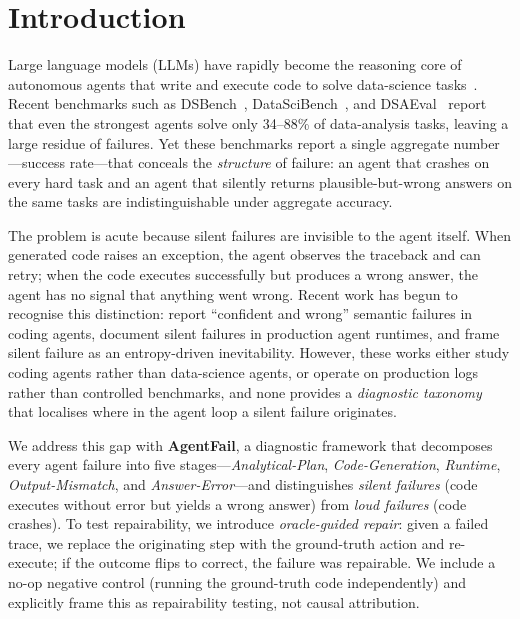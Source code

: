 \section{Introduction}
\label{sec:intro}

Large language models (LLMs) have rapidly become the reasoning core of autonomous agents that write and execute code to solve data-science tasks~\citep{maojun2025survey,rahman2025llmbased}. Recent benchmarks such as DSBench~\citep{jing2024dsbench}, DataSciBench~\citep{zhang2026datascibench}, and DSAEval~\citep{sun2026dsaeval} report that even the strongest agents solve only 34--88\% of data-analysis tasks, leaving a large residue of failures. Yet these benchmarks report a single aggregate number---success rate---that conceals the \emph{structure} of failure: an agent that crashes on every hard task and an agent that silently returns plausible-but-wrong answers on the same tasks are indistinguishable under aggregate accuracy.

The problem is acute because silent failures are invisible to the agent itself. When generated code raises an exception, the agent observes the traceback and can retry; when the code executes successfully but produces a wrong answer, the agent has no signal that anything went wrong. Recent work has begun to recognise this distinction: \citet{mehta2026confident} report ``confident and wrong'' semantic failures in coding agents, \citet{wu2026when} document silent failures in production agent runtimes, and \citet{liu2026silent} frame silent failure as an entropy-driven inevitability. However, these works either study coding agents rather than data-science agents, or operate on production logs rather than controlled benchmarks, and none provides a \emph{diagnostic taxonomy} that localises where in the agent loop a silent failure originates.

We address this gap with \textbf{AgentFail}, a diagnostic framework that decomposes every agent failure into five stages---\emph{Analytical-Plan}, \emph{Code-Generation}, \emph{Runtime}, \emph{Output-Mismatch}, and \emph{Answer-Error}---and distinguishes \emph{silent failures} (code executes without error but yields a wrong answer) from \emph{loud failures} (code crashes). To test repairability, we introduce \emph{oracle-guided repair}: given a failed trace, we replace the originating step with the ground-truth action and re-execute; if the outcome flips to correct, the failure was repairable. We include a no-op negative control (running the ground-truth code independently) and explicitly frame this as repairability testing, not causal attribution.

